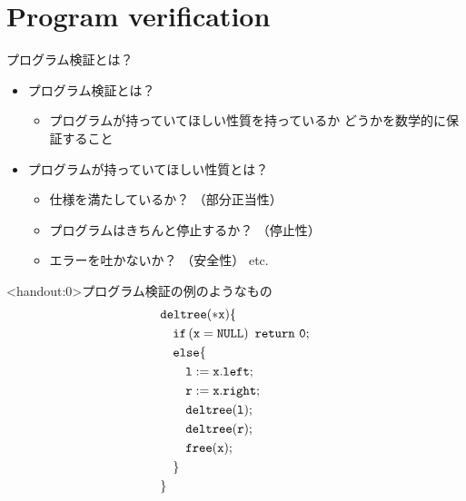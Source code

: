 \documentclass[notheorems, aspectratio=169, 12pt, unicode]{beamer}
\begin{document}
\section{Program verification}

\begin{frame}{プログラム検証とは？}
 \begin{itemize}
  \item \alert{プログラム検証}とは？ \pause
	\begin{itemize}
	 \item プログラムが持っていてほしい性質を持っているか
	 どうかを数学的に保証すること \pause
	\end{itemize}
  \item プログラムが持っていてほしい性質とは？ \pause
	\begin{itemize}
	 \item 仕様を満たしているか？
	       （\alert{部分正当性}）
	 \item プログラムはきちんと停止するか？
	       （\alert{停止性}）
	 \item エラーを吐かないか？
	       （\alert{安全性}）
	       \quad etc.
	\end{itemize}
 \end{itemize}
\end{frame}

\begin{frame}<handout:0>{プログラム検証の例のようなもの}
 \minusbaselineskip
 \begin{align*} 
  & \mathtt{deltree(*x)} \{  \\
  &\quad \mathtt{if\left(x=NULL\right)\ return\ 0;} \\
  &\quad  \mathtt{else \{} \\
  &\qquad \mathtt{l := x.left;} \\ 
  &\qquad \mathtt{r := x.right;} \\
  &\qquad  \mathtt{deltree(l);} \\ 
  &\qquad \mathtt{deltree(r);}  \\
  &\qquad  \mathtt{free(x);} \\
  &\quad \mathtt{\}} \\
  &\mathtt{\}}
 \end{align*} 
\end{frame}
\end{document}
